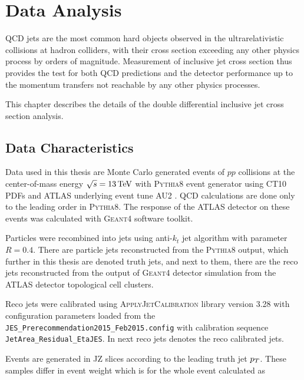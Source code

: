 \chapter{Data Analysis}


QCD jets are the most common hard objects observed in the ultrarelativistic
collisions at hadron colliders, with their cross section exceeding any other
physics process by orders of magnitude.  Measurement of inclusive jet cross
section thus provides the test for both QCD predictions and the detector
performance up to the momentum transfers not reachable by any other physics
processes. 

This chapter describes the details of the double differential inclusive jet
cross section analysis.

\section{Data Characteristics}

Data used in this thesis are Monte Carlo generated events of $pp$ collisions at
the center-of-mass energy $\sqrt{s} = 13\,\text{TeV}$ with \textsc{Pythia8}
\cite{Pythia8} event generator using CT10 PDFs \cite{CT10PDF} and ATLAS underlying event
tune AU2 \cite{AU2}. QCD calculations are done only to the leading order in
\textsc{Pythia8}. The response of the ATLAS detector on these events was
calculated with \textsc{Geant4} \cite{Geant4} software toolkit.

Particles were recombined into jets using anti-$k_t$ jet algorithm with parameter $R=0.4$.
There are particle jets reconstructed from the \textsc{Pythia8} output, which
further in this thesis are denoted truth jets, and next to them, there are the
reco jets reconstructed from the output of \textsc{Geant4} detector
simulation from the ATLAS detector topological cell clusters. 

Reco jets were calibrated using \textsc{ApplyJetCalibration}
\cite{ApplyJetCalibration} library version 3.28 with configuration parameters
loaded from the \texttt{JES\_Prerecommendation2015\_Feb2015.config} with
calibration sequence \texttt{JetArea\_Residual\_EtaJES}. In next reco jets
denotes the reco calibrated jets.

Events are generated in JZ slices according to 
the leading truth jet $p_{T}$. These samples differ in event weight which is for
the whole event calculated as 

